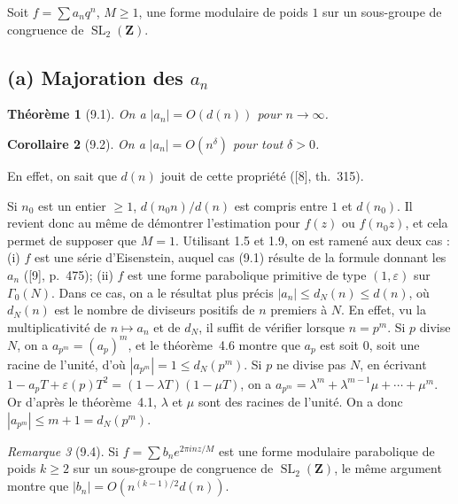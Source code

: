 \documentclass[11pt]{amsart}
\theoremstyle{plain}
\newtheorem{theoreme}{Théorème}[section]
\newtheorem{corollaire}[theoreme]{Corollaire}
\theoremstyle{definition}
\theoremstyle{remark}
\newtheorem{remarque}[theoreme]{Remarque}
\DeclareMathOperator{\SL}{SL}
\newcommand{\Z}{\mathbf{Z}}
\begin{document}
Soit $f = \sum a_n q^n$, $M \geq 1$, une forme modulaire de poids $1$ sur un sous-groupe de congruence de $\SL_2(\Z)$.

\subsection*{(a) Majoration des $a_n$}

\begin{theoreme}[9.1]
On a $|a_n| = O(d(n))$ pour $n \to \infty$.
\end{theoreme}

\begin{corollaire}[9.2]
On a $|a_n| = O(n^\delta)$ pour tout $\delta > 0$.
\end{corollaire}
En effet, on sait que $d(n)$ jouit de cette propri\'et\'e ([8], th.~315).

Si $n_0$ est un entier $\geq 1$, $d(n_0 n)/d(n)$ est compris entre $1$ et $d(n_0)$. Il revient donc au m\^eme de d\'emontrer l'estimation pour $f(z)$ ou $f(n_0 z)$, et cela permet de supposer que $M = 1$. Utilisant 1.5 et 1.9, on est ramen\'e aux deux cas : (i) $f$ est une s\'erie d'Eisenstein, auquel cas (9.1) r\'esulte de la formule donnant les $a_n$ ([9], p.~475); (ii) $f$ est une forme parabolique primitive de type $(1, \varepsilon)$ sur $\Gamma_0(N)$. Dans ce cas, on a le r\'esultat plus pr\'ecis $|a_n| \leq d_N(n) \leq d(n)$, o\`u $d_N(n)$ est le nombre de diviseurs positifs de $n$ premiers \`a $N$. En effet, vu la multiplicativit\'e de $n \mapsto a_n$ et de $d_N$, il suffit de v\'erifier lorsque $n = p^m$. Si $p$ divise $N$, on a $a_{p^m} = (a_p)^m$, et le th\'eor\`eme~4.6 montre que $a_p$ est soit $0$, soit une racine de l'unit\'e, d'o\`u $|a_{p^m}| = 1 \leq d_N(p^m)$. Si $p$ ne divise pas $N$, en \'ecrivant $1 - a_p T + \varepsilon(p) T^2 = (1 - \lambda T)(1 - \mu T)$, on a $a_{p^m} = \lambda^m + \lambda^{m-1}\mu + \cdots + \mu^m$. Or d'apr\`es le th\'eor\`eme~4.1, $\lambda$ et $\mu$ sont des racines de l'unit\'e. On a donc $|a_{p^m}| \leq m+1 = d_N(p^m)$.

\begin{remarque}[9.4]
Si $f = \sum b_n e^{2\pi i n z/M}$ est une forme modulaire parabolique de poids $k \geq 2$ sur un sous-groupe de congruence de $\SL_2(\Z)$, le m\^eme argument montre que $|b_n| = O(n^{(k-1)/2} d(n))$.
\end{remarque}
\end{document}
